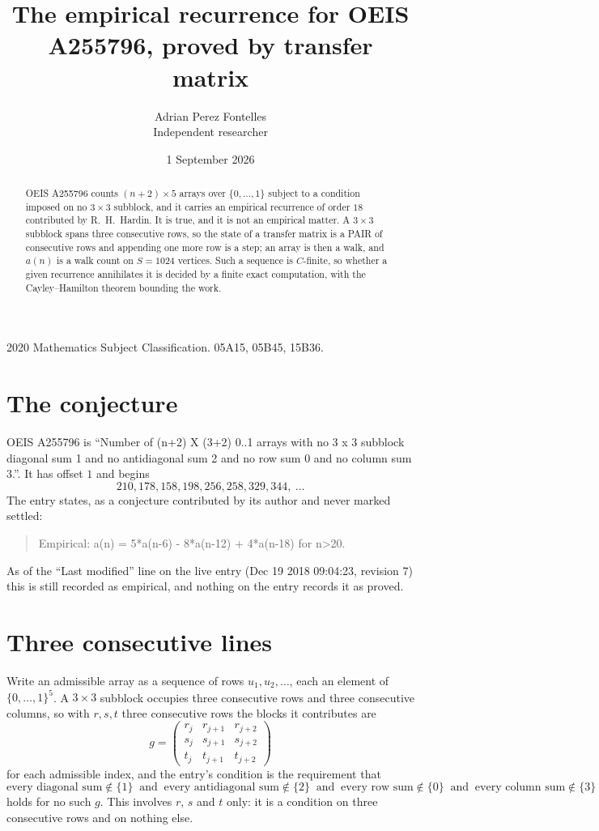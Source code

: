 \documentclass[11pt,a4paper]{article}
\title{The empirical recurrence for OEIS A255796, proved by transfer matrix}
\author{Adrian Perez Fontelles\\ \small Independent researcher}
\date{1 September 2026}
\theoremstyle{plain}
\theoremstyle{definition}
\begin{document}
\maketitle

\begin{abstract}
OEIS A255796 counts $(n+2)\times5$ arrays over $\{0,\dots,1\}$ subject to a condition imposed on
no $3\times3$ subblock, and it carries an empirical recurrence of order $18$
contributed by R.~H.~Hardin. It is true, and it is not an empirical matter. A $3\times3$
subblock spans three consecutive rows, so the state of a transfer matrix is a PAIR of
consecutive rows and appending one more row is a step; an array is then a walk, and
$a(n)$ is a walk count on $S=1024$ vertices. Such a sequence is $C$-finite, so whether a given
recurrence annihilates it is decided by a finite exact computation, with the Cayley--Hamilton
theorem bounding the work.
\end{abstract}

\noindent\small 2020 Mathematics Subject Classification. 05A15, 05B45, 15B36.\normalsize

\section{The conjecture}

OEIS A255796 is ``Number of (n+2) X (3+2) 0..1 arrays with no 3 x 3 subblock diagonal sum 1 and no antidiagonal sum 2 and no row sum 0 and no column sum 3.''. It has offset $1$ and begins
\[
210, 178, 158, 198, 256, 258, 329, 344,\ \dots
\]
The entry states, as a conjecture contributed by its author and never marked settled:
\begin{quote}
Empirical: a(n) = 5*a(n-6) - 8*a(n-12) + 4*a(n-18) for n>20.
\end{quote}
As of the ``Last modified'' line on the live entry (Dec 19 2018 09:04:23, revision 7) this is still
recorded as empirical, and nothing on the entry records it as proved.

\section{Three consecutive lines}

Write an admissible array as a sequence of rows $u_1,u_2,\dots$, each an element of
$\{0,\dots,1\}^{5}$. A $3\times3$ subblock occupies three consecutive rows and
three consecutive columns, so with $r,s,t$ three consecutive rows the blocks it
contributes are
\[
g=\begin{pmatrix}r_j&r_{j+1}&r_{j+2}\\ s_j&s_{j+1}&s_{j+2}\\ t_j&t_{j+1}&t_{j+2}\end{pmatrix}
\]
for each admissible index, and the entry's condition is the requirement that
\[
\text{every diagonal sum} \notin \{1\}\ \text{ and }\ \text{every antidiagonal sum} \notin \{2\}\ \text{ and }\ \text{every row sum} \notin \{0\}\ \text{ and }\ \text{every column sum} \notin \{3\}
\]
holds for no such $g$. This involves $r$, $s$ and $t$ only: it is a condition on
three consecutive rows and on nothing else.
\end{document}
